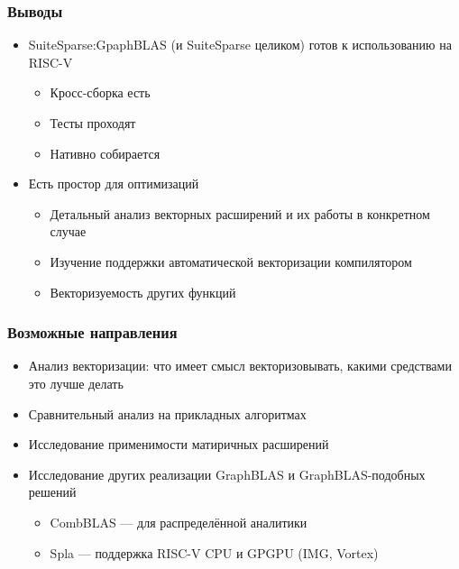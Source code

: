 \documentclass[xcolor=table,aspectratio=169]{beamer}
\begin{document}
\begin{frame}[fragile]
  \frametitle{Выводы}
  \begin{itemize}
    \item SuiteSparse:GpaphBLAS (и SuiteSparse целиком) готов к использованию на RISC-V
    \begin{itemize}
      \item Кросс-сборка есть
      \item Тесты проходят
      \item Нативно собирается
    \end{itemize}
    \vfill
    \pause
    \item Есть простор для оптимизаций
    \begin{itemize}
      \item Детальный анализ векторных расширений и их работы в конкретном случае
      \item Изучение поддержки автоматической векторизации компилятором
      \item Векторизуемость других функций
    \end{itemize}
  \end{itemize}
\end{frame}

\begin{frame}[fragile]
  \frametitle{Возможные направления}
  \begin{itemize}
    \item Анализ векторизации: что имеет смысл векторизовывать, какими средствами это лучше делать
    \item Сравнительный анализ на прикладных алгоритмах
    \item Исследование применимости матиричных расширений
    \item Исследование других реализации GraphBLAS и GraphBLAS-подобных решений    
    \begin{itemize}
      \item CombBLAS --- для распределённой аналитики
      \item Spla --- поддержка RISC-V CPU и GPGPU (IMG, Vortex)      
    \end{itemize}
  \end{itemize}
\end{frame}
\end{document}
